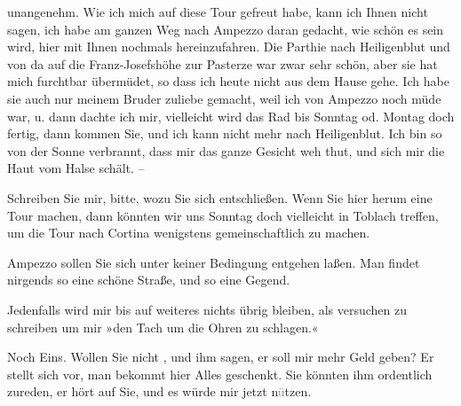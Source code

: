                unangenehm. Wie ich mich auf diese Tour gefreut habe, kann ich Ihnen nicht sagen, ich
               habe am ganzen Weg nach Ampezzo daran gedacht,
               wie schön es sein wird, hier mit Ihnen nochmals hereinzufahren. Die Parthie nach Heiligenblut und von da auf die Franz-Josefshöhe zur Pasterze war zwar sehr schön, aber sie hat mich furchtbar
               übermüdet, so dass ich heute nicht aus dem Hause gehe.
               Ich habe sie auch nur meinem Bruder zuliebe gemacht, weil ich von Ampezzo noch müde war, u. dann dachte ich mir, vielleicht
               wird das Rad bis Sonntag od. Montag doch fertig, dann kommen Sie, und ich kann nicht mehr nach Heiligenblut. Ich bin so von der Sonne
               verbrannt, dass mir das ganze Gesicht weh thut, und sich mir die Haut vom Halse
               schält. –\pend
           
\pstart
           {\pb}Schreiben Sie mir, bitte,
               wozu Sie sich entschließen. Wenn Sie hier herum eine Tour machen, dann könnten wir
               uns Sonntag doch vielleicht in Toblach treffen, um die Tour nach Cortina wenigstens gemeinschaftlich zu machen.\pend
           
\pstart
           Ampezzo sollen Sie sich unter keiner Bedingung
               entgehen laßen. Man findet nirgends so eine schöne Straße, und so eine Gegend.\pend
           
\pstart
           Jedenfalls wird mir bis auf weiteres nichts übrig bleiben, als versuchen zu
                  schreiben um mir »den Tach um die Ohren zu schlagen.«\pend
           
\pstart
           Noch Eins. Wollen Sie nicht \label{K_L03128-6v}\label{K_L03128-6}, und ihm sagen, er
               soll mir mehr Geld geben? Er stellt sich vor, man bekommt hier Alles geschenkt. Sie
               könnten ihm ordentlich zureden, er hört auf Sie, und es würde mir jetzt
                  n\textcolor{gray}{ü}tzen.\pend
           
